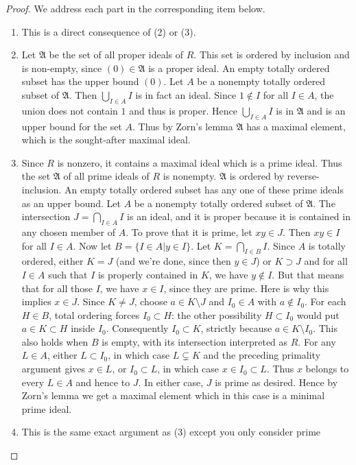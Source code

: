 \begin{proof}
We address each part in the corresponding item below.
\begin{enumerate}
\item This is a direct consequence of (2) or (3).
\item Let $\mathfrak{A}$ be the set of all proper ideals of $R$. This set is
ordered by inclusion and is non-empty, since $(0) \in \mathfrak{A}$ is a proper
ideal. An empty totally ordered subset has the upper bound $(0)$.
Let $A$ be a nonempty totally ordered subset of $\mathfrak A$.
Then $\bigcup_{I \in A} I$ is in
fact an ideal. Since $1 \notin I$ for all $I \in A$, the union does not contain
$1$ and thus is proper. Hence $\bigcup_{I \in A} I$ is in $\mathfrak{A}$ and is
an upper bound for the set $A$. Thus by Zorn's lemma $\mathfrak{A}$ has a
maximal element, which is the sought-after maximal ideal.
\item Since $R$ is nonzero, it contains a maximal ideal which is a prime ideal.
Thus the set $\mathfrak{A}$ of all prime ideals of $R$ is nonempty.
$\mathfrak{A}$ is ordered by reverse-inclusion. An empty totally
ordered subset has any one of these prime ideals as an upper bound.
Let $A$ be a nonempty totally ordered subset of $\mathfrak{A}$.
The intersection $J = \bigcap_{I \in A} I$ is an ideal, and it is proper
because it is contained in any chosen member of $A$.
To prove that it is prime, let $xy \in J$.
Then $xy \in I$ for all $I \in A$. Now let $B = \{I \in A | y \in I\}$. Let $K
= \bigcap_{I \in B} I$. Since $A$ is totally ordered, either $K = J$ (and we're
done, since then $y \in J$) or $K \supset J$ and for all $I \in A$ such that
$I$ is properly contained in $K$, we have $y \notin I$. But that means that for
all those $I$, we have $x \in I$, since they are prime.
Here is why this implies $x \in J$. Since $K\ne J$, choose
$a\in K\setminus J$ and $I_0\in A$ with $a\notin I_0$.
For each $H\in B$, total ordering forces $I_0\subset H$:
the other possibility $H\subset I_0$ would put $a\in K\subset H$
inside $I_0$. Consequently $I_0\subset K$, strictly because
$a\in K\setminus I_0$. This also holds when $B$ is empty,
with its intersection interpreted as $R$.
For any $L\in A$, either $L\subset I_0$, in which case
$L\subsetneq K$ and the preceding primality argument gives $x\in L$,
or $I_0\subset L$, in which case $x\in I_0\subset L$.
Thus $x$ belongs to every $L\in A$ and hence to $J$. In either case,
$J$ is prime as desired. Hence by Zorn's lemma we get a maximal element which
in this case is a minimal prime ideal.
\item This is the same exact argument as (3) except you only consider prime

\end{enumerate}
\end{proof}
